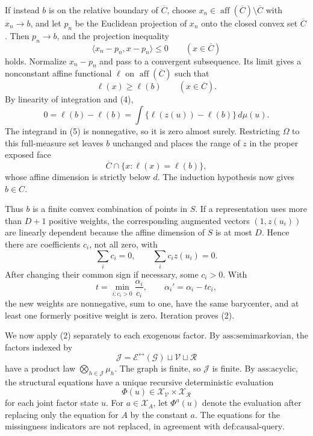 If instead \(b\) is on the relative boundary of \(\overline C\), choose \(x_n\in\operatorname{aff}(\overline C)\setminus\overline C\) with \(x_n\to b\), and let \(p_n\) be the Euclidean projection of \(x_n\) onto the closed convex set \(\overline C\).  Then \(p_n\to b\), and the projection inequality
\[
\langle x_n-p_n,x-p_n\rangle\leq0
\qquad(x\in\overline C)
\]
holds.  Normalize \(x_n-p_n\) and pass to a convergent subsequence.  Its limit gives a nonconstant affine functional \(\ell\) on \(\operatorname{aff}(\overline C)\) such that
\[
\ell(x)\geq\ell(b)
\qquad(x\in\overline C).
\tag{4}
\]
By linearity of integration and (4),
\[
0=\ell(b)-\ell(b)
=\int\{\ell(z(u))-\ell(b)\}\,d\mu(u).
\tag{5}
\]
The integrand in (5) is nonnegative, so it is zero almost surely.  Restricting \(\Omega\) to this full-measure set leaves \(b\) unchanged and places the range of \(z\) in the proper exposed face
\[
\overline C\cap\{x:\ell(x)=\ell(b)\},
\]
whose affine dimension is strictly below \(d\).  The induction hypothesis now gives \(b\in C\).

Thus \(b\) is a finite convex combination of points in \(S\).  If a representation uses more than \(D+1\) positive weights, the corresponding augmented vectors \((1,z(u_i))\) are linearly dependent because the affine dimension of \(S\) is at most \(D\).  Hence there are coefficients \(c_i\), not all zero, with
\[
\sum_i c_i=0,
\qquad
\sum_i c_i z(u_i)=0.
\]
After changing their common sign if necessary, some \(c_i>0\).  With
\[
t=\min_{i:c_i>0}\frac{\alpha_i}{c_i},
\qquad
\alpha_i'=\alpha_i-tc_i,
\]
the new weights are nonnegative, sum to one, have the same barycenter, and at least one formerly positive weight is zero.  Iteration proves (2).

We now apply (2) separately to each exogenous factor.  By \(\text{ass:semimarkovian}\), the factors indexed by
\[
\mathcal J=\mathcal E^{\leftrightarrow}(\mathcal G)\sqcup\mathcal V\sqcup\mathcal R
\]
have a product law \(\bigotimes_{h\in\mathcal J}\mu_h\).  The graph is finite, so \(\mathcal J\) is finite.  By \(\text{ass:acyclic}\), the structural equations have a unique recursive deterministic evaluation
\[
\Phi(u)\in\mathcal X_{\mathcal V}\times\mathcal X_{\mathcal R}
\]
for each joint factor state \(u\).  For \(a\in\mathcal X_A\), let \(\Phi^a(u)\) denote the evaluation after replacing only the equation for \(A\) by the constant \(a\).  The equations for the missingness indicators are not replaced, in agreement with \(\text{def:causal-query}\).

